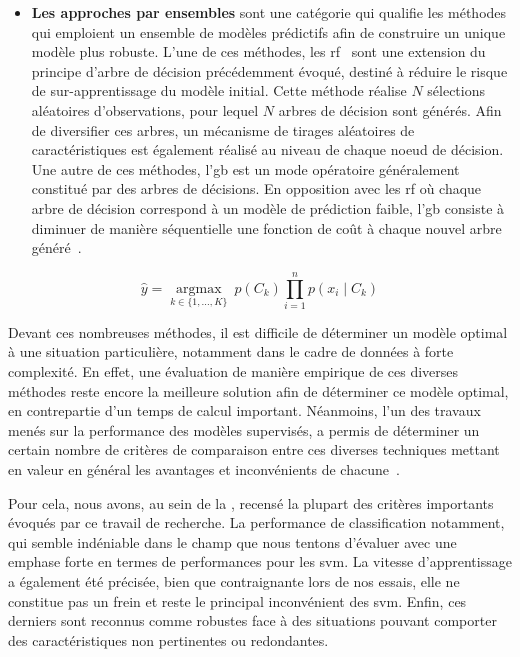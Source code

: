 \begin{itemize}
    \item \textbf{Les approches par ensembles} sont une catégorie qui qualifie les méthodes qui emploient un ensemble de modèles prédictifs afin de construire un unique modèle plus robuste. L'une de ces méthodes, les \gls{rf}~\cite{Breiman2001} sont une extension du principe d'arbre de décision précédemment évoqué, destiné à réduire le risque de sur-apprentissage du modèle initial. Cette méthode réalise $N$ sélections aléatoires d'observations, pour lequel $N$ arbres de décision sont générés. Afin de diversifier ces arbres, un mécanisme de tirages aléatoires de caractéristiques est également réalisé au niveau de chaque noeud de décision. Une autre de ces méthodes, l'\gls{gb} est un mode opératoire généralement constitué par des arbres de décisions. En opposition avec les \gls{rf} où chaque arbre de décision correspond à un modèle de prédiction faible, l'\gls{gb} consiste à diminuer de manière séquentielle une fonction de coût à chaque nouvel arbre généré~\cite{Friedman2001}.
\end{itemize}\par

\begin{equation} 
    \label{eq:bayesian}
    \hat{y} = \underset{k \in \{1, \ldots, K\}}{\operatorname{argmax}} \ p(C_k) \displaystyle\prod_{i=1}^n p(x_i \mid C_k)
\end{equation}

Devant ces nombreuses méthodes, il est difficile de déterminer un modèle optimal à une situation particulière, notamment dans le cadre de données à forte complexité. En effet, une évaluation de manière empirique de ces diverses méthodes reste encore la meilleure solution afin de déterminer ce modèle optimal, en contrepartie d'un temps de calcul important. Néanmoins, l'un des travaux menés sur la performance des modèles supervisés, a permis de déterminer un certain nombre de critères de comparaison entre ces diverses techniques mettant en valeur en général les avantages et inconvénients de chacune~\cite{Kotsiantis2007}.\par

Pour cela, nous avons, au sein de la , recensé la plupart des critères importants évoqués par ce travail de recherche. La performance de classification notamment, qui semble indéniable dans le champ que nous tentons d'évaluer avec une emphase forte en termes de performances pour les \gls{svm}. La vitesse d'apprentissage a également été précisée, bien que contraignante lors de nos essais, elle ne constitue pas un frein et reste le principal inconvénient des \gls{svm}. Enfin, ces derniers sont reconnus comme robustes face à des situations pouvant comporter des caractéristiques non pertinentes ou redondantes.\par

